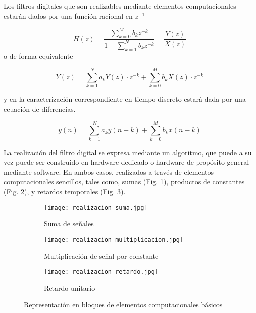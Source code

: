 \documentclass[informe.tex]{subfiles}
\begin{document}
Los filtros digitales que son realizables mediante elementos computacionales estarán dados por una función racional en $z^{-1}$

	$$
		H(z)= \frac{ \sum_{ k=0 }^{ M }{ b_k z^{-k}} }
		           { 1 - \sum_{ k=1 }^{ N }{ b_k z^{-k}} }
		= \frac{Y(z)}{X(z)}
	$$
o de forma equivalente

	$$
		Y(z)=\sum_{k=1}^{N}{a_k Y(z) \cdot z^{-k}} + \sum_{k=0}^{M}{b_k X(z) \cdot z^{-k}}
	$$

y en la caracterización correspondiente en tiempo discreto estará dada por una ecuación de diferencias.

	\begin{equation}
		\label{eqn:ec:dif}	
		y(n)=\sum_{k=1}^{N}{a_k y(n-k)} + 
		            \sum_{k=0}^{M}{b_k x(n-k)}
	\end{equation}
	
La realización del filtro digital se expresa mediante un algoritmo, que puede a su vez puede ser construido en hardware dedicado o hardware de propósito general mediante software. En ambos casos, realizados a través de elementos computacionales sencillos, tales como, sumas (Fig. \ref{fig:realizacion:suma}), productos de constantes (Fig. \ref{fig:realizacion:multiplicacion}), y retardos temporales (Fig. \ref{fig:realizacion:retardo}).\newline
 
\begin{figure}[h]
     \centering
     \begin{subfigure}[b]{0.3\textwidth}
         \centering
         \texttt{[image: realizacion\_suma.jpg]}
         \caption{Suma de señales}
         \label{fig:realizacion:suma}
     \end{subfigure}
     \hfill
     \begin{subfigure}[b]{0.3\textwidth}
         \centering
         \texttt{[image: realizacion\_multiplicacion.jpg]}
         \caption{Multiplicación de señal por constante}
         \label{fig:realizacion:multiplicacion}
     \end{subfigure}
     \hfill
     \begin{subfigure}[b]{0.3\textwidth}
         \centering
         \texttt{[image: realizacion\_retardo.jpg]}
         \caption{Retardo unitario}
         \label{fig:realizacion:retardo}
     \end{subfigure}
 		\caption{Representación en bloques de elementos computacionales básicos}
        \label{fig:realizacion:elementos_computacionales}
\end{figure}
\end{document}
